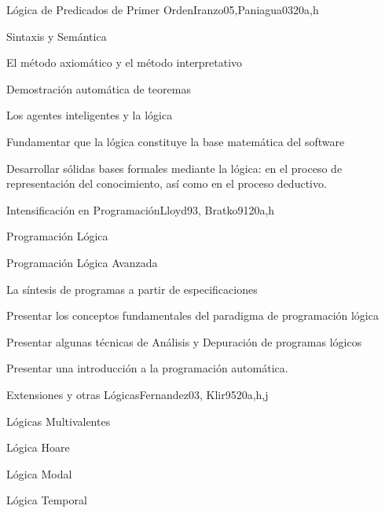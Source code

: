 \begin{syllabus}
\begin{unit}{Lógica de Predicados de Primer Orden}{}{Iranzo05,Paniagua03}{20}{a,h}
   \begin{topics}
         \item  Sintaxis y Semántica
         \item  El método axiomático y el método interpretativo
         \item  Demostración automática de teoremas
         \item  Los agentes inteligentes y la lógica
   \end{topics}
   \begin{learningoutcomes}
         \item Fundamentar que la lógica constituye la base matemática del software
         \item Desarrollar sólidas bases formales mediante la lógica: en el proceso de representación del conocimiento, así­ como en el proceso deductivo.
   \end{learningoutcomes}
\end{unit}

\begin{unit}{Intensificación en Programación}{}{Lloyd93, Bratko91}{20}{a,h}
   \begin{topics}
         \item Programación Lógica
         \item Programación Lógica Avanzada
         \item La sí­ntesis de programas a partir de especificaciones
   \end{topics}

   \begin{learningoutcomes}
         \item Presentar los conceptos fundamentales del paradigma de programación lógica
         \item Presentar algunas técnicas de Análisis y Depuración de programas lógicos
         \item Presentar una introducción a la programación automática.
   \end{learningoutcomes}
\end{unit}

\begin{unit}{Extensiones y otras Lógicas}{}{Fernandez03, Klir95}{20}{a,h,j}
   \begin{topics}
      \item Lógicas Multivalentes
      \item Lógica Hoare
      \item Lógica Modal
      \item Lógica Temporal
   \end{topics}


\end{unit}
\end{syllabus}
